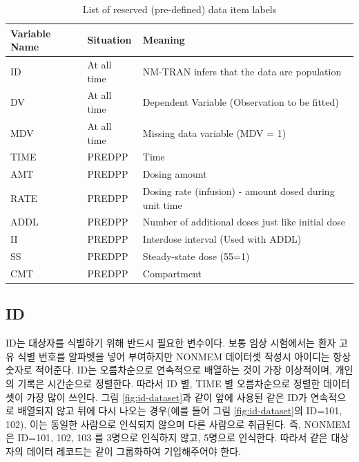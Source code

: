 \documentclass[
  11pt,
  krantz2, a4paper, twoside]{krantz}
\theoremstyle{definition}
\theoremstyle{definition}
\theoremstyle{definition}
\theoremstyle{remark}
\begin{document}
\begin{table}

\caption{\label{tab:reserveditems}List of reserved (pre-defined) data item labels}
\centering
\begin{tabular}[t]{>{\raggedright\arraybackslash}p{2cm}>{\raggedright\arraybackslash}p{2cm}>{\raggedright\arraybackslash}p{8cm}}
\toprule
Variable Name & Situation & Meaning\\
\midrule
ID & At all time & NM-TRAN infers that the data are population\\
DV & At all time & Dependent Variable (Observation to be fitted)\\
MDV & At all time & Missing data variable (MDV = 1)\\
TIME & PREDPP & Time\\
AMT & PREDPP & Dosing amount\\
\addlinespace
RATE & PREDPP & Dosing rate (infusion) - amount dosed during unit time\\
ADDL & PREDPP & Number of additional doses just like initial dose\\
II & PREDPP & Interdose interval (Used with ADDL)\\
SS & PREDPP & Steady-state dose (55=1)\\
CMT & PREDPP & Compartment\\
\bottomrule
\end{tabular}
\end{table}

\hypertarget{id}{%
\subsection{ID}\label{id}}


ID는 대상자를 식별하기 위해 반드시 필요한 변수이다. 보통 임상 시험에서는 환자 고유 식별 번호를 알파벳을 넣어 부여하지만 NONMEM 데이터셋 작성시 아이디는 항상 숫자로 적어준다. ID는 오름차순으로 연속적으로 배열하는 것이 가장 이상적이며, 개인의 기록은 시간순으로 정렬한다. 따라서 ID 별, TIME 별 오름차순으로 정렬한 데이터 셋이 가장 많이 쓰인다. 그림 \ref{fig:id-dataset}과 같이 앞에 사용된 같은 ID가 연속적으로 배열되지 않고 뒤에 다시 나오는 경우(예를 들어 그림 \ref{fig:id-dataset}의 ID=101, 102), 이는 동일한 사람으로 인식되지 않으며 다른 사람으로 취급된다. 즉, NONMEM 은 ID=101, 102, 103 를 3명으로 인식하지 않고, 5명으로 인식한다. 따라서 같은 대상자의 데이터 레코드는 같이 그룹화하여 기입해주어야 한다.

\end{document}
